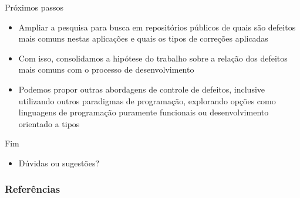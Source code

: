 \documentclass[brazilian]{beamer}
\begin{document}
\begin{frame}{Próximos passos}
    \begin{itemize}
        \item Ampliar a pesquisa para busca em repositórios públicos de quais são defeitos mais comuns nestas aplicações e quais os tipos de correções aplicadas
        \item Com isso, consolidamos a hipótese do trabalho sobre a relação dos defeitos mais comuns com o processo de desenvolvimento
        \item Podemos propor outras abordagens de controle de defeitos, inclusive utilizando outros paradigmas de programação, explorando opções como linguagens de programação puramente funcionais ou desenvolvimento orientado a tipos
    \end{itemize}
\end{frame}

\begin{frame}{Fim}
    \begin{itemize}
        \centering
        \item Dúvidas ou sugestões?
    \end{itemize}
\end{frame}

\begin{frame}[allowframebreaks]
    \frametitle{Referências}
    
    
\end{frame}
\end{document}

